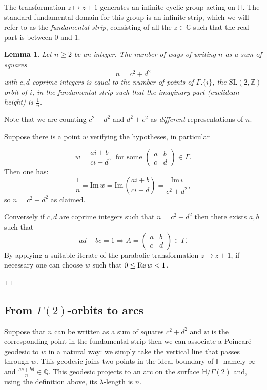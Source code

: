 \documentclass[12pt,a4paper]{amsart}
\newtheorem{lem}[thm]{Lemma}
\def\HH{\mathbb{H}}
\def\im{\mathrm{Im}\,}
\def\g2{\Gamma(2)}
\def\xx{\HH/\g2}
\def\ZZ{\mathbb{Z}}
\def\CC{\mathbb{C}}
\def\sl2{\mathrm{SL}(2, \ZZ)}
\def\oi{\Gamma.\{i\}}
\begin{document}
The transformation $z \mapsto z + 1$ generates an infinite cyclic
group acting on $\mathbb{H}$.
The standard fundamental domain for this group is an infinite strip,
which we will refer to as the \textit{fundamental strip},
consisting of all the $z\in \CC$ such that 
the real part is between $0$ and $1$.

\begin{lem} \label{counting squares}
Let $n\geq2$ be an integer.
The number of  ways of writing $n$  as a  sum of squares
$$n = c^2 + d^2$$
with $c,d$ coprime integers
is equal to the number of points
of $\oi$, 
the $\sl2$  orbit of $i$,
in the fundamental strip such that the imaginary part (euclidean height) is $\frac{1}{n}$.
\end{lem}
Note that we are counting $c^2 + d^2$ and $d^2 + c^2$ 
as \textit{different} representations of $n$.

\proof  Suppose there is a point $w$
verifying the hypotheses, in particular

$$w = \frac{ai + b}{ci + d},\, 
\text{ for some } \begin{pmatrix} a&b\\c&d
\end{pmatrix} \in \Gamma.$$
Then one has:
\begin{equation}\label{imaginary height}
\frac{1}{n}= \im w = \im  \left (\frac{ai +b}{ci+d } \right)
= \frac{\im i} {c^2 + d^2},
\end{equation}
so $n = c^2 + d^2$ as claimed.

Conversely if $c,d$ are coprime integers
such that $n=c^2 +d^2$
 then there exists $a,b$ such that
 $$ad - bc = 1 \Rightarrow  
A =  \begin{pmatrix}
 a & b \\
 c & d
 \end{pmatrix} \in \Gamma.
$$
By applying a suitable iterate of the parabolic transformation 
$z \mapsto z + 1$, if necessary 
one can choose $w$ such that $0 \leq \text{Re\,} w < 1$.

\hfill $\Box$

\subsection{From $\Gamma(2)$-orbits to arcs}

Suppose that $n$ can be written as a sum of squares $c^2 +d^2$
and $w$ is the corresponding point in the fundamental strip then we
can associate a Poincaré geodesic to $w$ in a natural way: 
we simply take the vertical line that passes through $w$.
This geodesic joins two points in the ideal boundary of $\mathbb{H}$
namely $\infty$ and $\frac{ac + bd}{n}\in \mathbb{Q}$.
This geodesic projects to an arc on the surface $\xx$
and, using the definition above, its $\lambda$-length is $n$.
\end{document}
